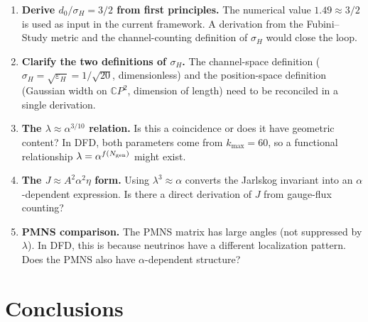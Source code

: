 \documentclass[11pt]{article}
\newcommand{\CP}{\mathbb{C}P}
\theoremstyle{remark}
\begin{document}
\begin{enumerate}
\item \textbf{Derive $d_0/\sigma_H = 3/2$ from first principles.}
  The numerical value $1.49 \approx 3/2$ is used as input in the
  current framework. A derivation from the Fubini--Study metric and
  the channel-counting definition of $\sigma_H$ would close the loop.

\item \textbf{Clarify the two definitions of $\sigma_H$.}
  The channel-space definition ($\sigma_H = \sqrt{\varepsilon_H} = 1/\sqrt{20}$,
  dimensionless) and the position-space definition (Gaussian width on $\CP^2$,
  dimension of length) need to be reconciled in a single derivation.

\item \textbf{The $\lambda \approx \alpha^{3/10}$ relation.}
  Is this a coincidence or does it have geometric content? In DFD,
  both parameters come from $k_{\max} = 60$, so a functional relationship
  $\lambda = \alpha^{f(N_{\rm gen})}$ might exist.

\item \textbf{The $J \approx A^2\alpha^2\eta$ form.}
  Using $\lambda^3 \approx \alpha$ converts the Jarlskog invariant
  into an $\alpha$-dependent expression. Is there a direct derivation
  of $J$ from gauge-flux counting?

\item \textbf{PMNS comparison.}
  The PMNS matrix has large angles (not suppressed by $\lambda$).
  In DFD, this is because neutrinos have a different localization
  pattern. Does the PMNS also have $\alpha$-dependent structure?
\end{enumerate}

\section{Conclusions}
\end{document}
